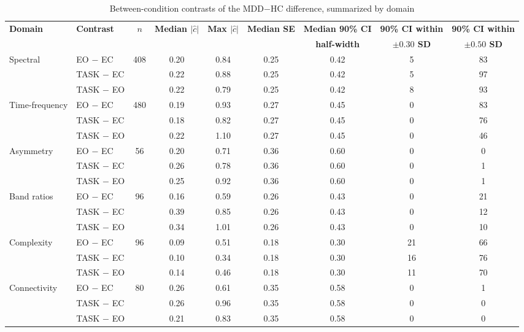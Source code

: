 \begin{table}[!t]
\caption{Between-condition contrasts of the MDD$-$HC difference, summarized by domain}
\label{tabS_contrastes}
\centering
\footnotesize
\renewcommand{\arraystretch}{1.1}
\setlength{\tabcolsep}{4pt}
\begin{tabular}{llccccccc}
\toprule
\textbf{Domain} & \textbf{Contrast} & \textbf{$n$} & \textbf{Median $|\hat{c}|$} & \textbf{Max $|\hat{c}|$} & \textbf{Median SE} & \textbf{Median 90\% CI} & \textbf{90\% CI within} & \textbf{90\% CI within} \\
 & & & & & & \textbf{half-width} & \textbf{$\pm 0.30$ SD} & \textbf{$\pm 0.50$ SD} \\
\midrule
Spectral & EO $-$ EC & 408 & 0.20 & 0.84 & 0.25 & 0.42 & 5 & 83 \\
 & TASK $-$ EC &  & 0.22 & 0.88 & 0.25 & 0.42 & 5 & 97 \\
 & TASK $-$ EO &  & 0.22 & 0.79 & 0.25 & 0.42 & 8 & 93 \\
\addlinespace
Time-frequency & EO $-$ EC & 480 & 0.19 & 0.93 & 0.27 & 0.45 & 0 & 83 \\
 & TASK $-$ EC &  & 0.18 & 0.82 & 0.27 & 0.45 & 0 & 76 \\
 & TASK $-$ EO &  & 0.22 & 1.10 & 0.27 & 0.45 & 0 & 46 \\
\addlinespace
Asymmetry & EO $-$ EC & 56 & 0.20 & 0.71 & 0.36 & 0.60 & 0 & 0 \\
 & TASK $-$ EC &  & 0.26 & 0.78 & 0.36 & 0.60 & 0 & 1 \\
 & TASK $-$ EO &  & 0.25 & 0.92 & 0.36 & 0.60 & 0 & 1 \\
\addlinespace
Band ratios & EO $-$ EC & 96 & 0.16 & 0.59 & 0.26 & 0.43 & 0 & 21 \\
 & TASK $-$ EC &  & 0.39 & 0.85 & 0.26 & 0.43 & 0 & 12 \\
 & TASK $-$ EO &  & 0.34 & 1.01 & 0.26 & 0.43 & 0 & 10 \\
\addlinespace
Complexity & EO $-$ EC & 96 & 0.09 & 0.51 & 0.18 & 0.30 & 21 & 66 \\
 & TASK $-$ EC &  & 0.10 & 0.34 & 0.18 & 0.30 & 16 & 76 \\
 & TASK $-$ EO &  & 0.14 & 0.46 & 0.18 & 0.30 & 11 & 70 \\
\addlinespace
Connectivity & EO $-$ EC & 80 & 0.26 & 0.61 & 0.35 & 0.58 & 0 & 1 \\
 & TASK $-$ EC &  & 0.26 & 0.96 & 0.35 & 0.58 & 0 & 0 \\
 & TASK $-$ EO &  & 0.21 & 0.83 & 0.35 & 0.58 & 0 & 0 \\

\end{tabular}
\end{table}
